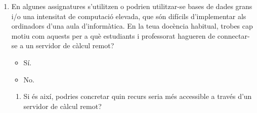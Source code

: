 \documentclass[a4paper,12pt]{article}
\begin{document}
\begin{enumerate}
\item En algunes assignatures s'utilitzen o podrien utilitzar-se bases de dades grans i/o una intensitat
      de computació elevada, que són difícils d'implementar als ordinadors d'una aula d'informàtica.
      En la teua docència habitual, trobes cap motiu com aquests per a què estudiants i professorat
      hagueren de connectar-se a un servidor de càlcul remot?
   \begin{itemize}
   \item Sí.
   \item No.
   \end{itemize}

   \begin{enumerate}
   \item Si és així, podries concretar quin recurs seria més accessible a través d'un servidor de
         càlcul remot?
   \vspace*{1cm}
   \end{enumerate}
\end{enumerate}



\end{document}

